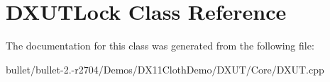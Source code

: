 \hypertarget{class_d_x_u_t_lock}{\section{D\+X\+U\+T\+Lock Class Reference}
\label{class_d_x_u_t_lock}
}


The documentation for this class was generated from the following file\+:\begin{DoxyCompactItemize}
\item 
bullet/bullet-\/2.-\/r2704/\+Demos/\+D\+X11\+Cloth\+Demo/\+D\+X\+U\+T/\+Core/D\+X\+U\+T.\+cpp\end{DoxyCompactItemize}
